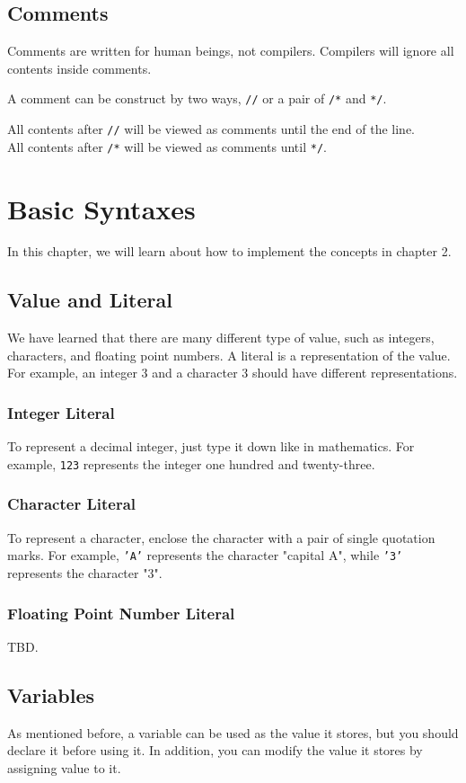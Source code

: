 \documentclass{report}
\begin{document}
\section{Comments}
Comments are written for human beings, not compilers. Compilers will ignore all contents inside comments.

A comment can be construct by two ways, \texttt{//} or a pair of \texttt{/*}  and \texttt{*/}.

All contents after \texttt{//} will be viewed as comments until the end of the line.\\
All contents after \texttt{/*} will be viewed as comments until \texttt{*/}.\\

\chapter{Basic Syntaxes}
In this chapter, we will learn about how to implement the concepts in chapter 2.

\section{Value and Literal}
    We have learned that there are many different type of value, such as integers, characters, and floating point numbers. A literal is a representation of the value. For example, an integer 3 and a character 3 should have different representations.
    \subsection{Integer Literal}
        To represent a decimal integer, just type it down like in mathematics. For example, \texttt{123} represents the integer one hundred and twenty-three.

    \subsection{Character Literal}
        To represent a character, enclose the character with a pair of single quotation marks. For example, \texttt{'A'} represents the character "capital A", while \texttt{'3'} represents the character "3".

    \subsection{Floating Point Number Literal}
        TBD.

\section{Variables}
    As mentioned before, a variable can be used as the value it stores, but you should declare it before using it. In addition, you can modify the value it stores by assigning value to it.
\end{document}
